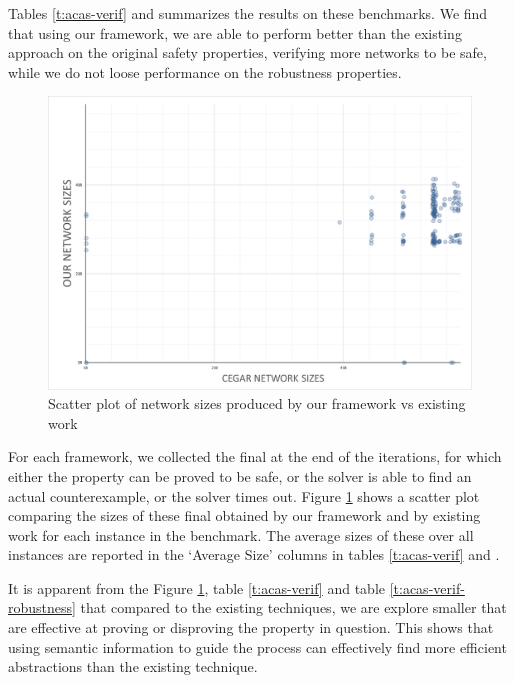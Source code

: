 Tables \ref{t:acas-verif} and \label{t:acas-verif-robustness} summarizes the
results on these benchmarks. We
find that using our framework, we are able to perform better than the existing
\cegar approach \cite{cegar-nn} on the original safety properties, verifying
more networks to be safe, while we do not loose performance on the robustness
properties. 

\begin{figure}
    \vspace*{-0.5cm}
    \includegraphics[scale=0.2]{figs/scatter-cegar-our-nerualsat.png}
    \caption{Scatter plot of network sizes produced by our framework vs existing
    work \cite{cegar-nn}}
    \label{f:scatter-netsizes}
    \vspace*{-0.5cm}
\end{figure}

For each framework, we collected the final \abs at the end of the \cegar
iterations, for which either the property can be proved to be safe, or 
the solver is able to find an actual counterexample, or the solver times out.  
Figure \ref{f:scatter-netsizes} shows a scatter plot comparing the sizes of these final \abs
obtained by our framework and by existing work \cite{cegar-nn} for each instance
in the benchmark. The average sizes of these \abs over all instances are
reported in the `Average Size' columns in tables \ref{t:acas-verif} and
\label{t:acas-verif-robustness}. 

It is apparent from the Figure \ref{f:scatter-netsizes}, 
table \ref{t:acas-verif} and table \ref{t:acas-verif-robustness} that compared 
to the existing techniques, we are explore smaller \abs that are effective 
at proving or disproving the property in question.
This shows that using semantic information to guide the \cegar process can
effectively find more efficient abstractions than the existing technique.

